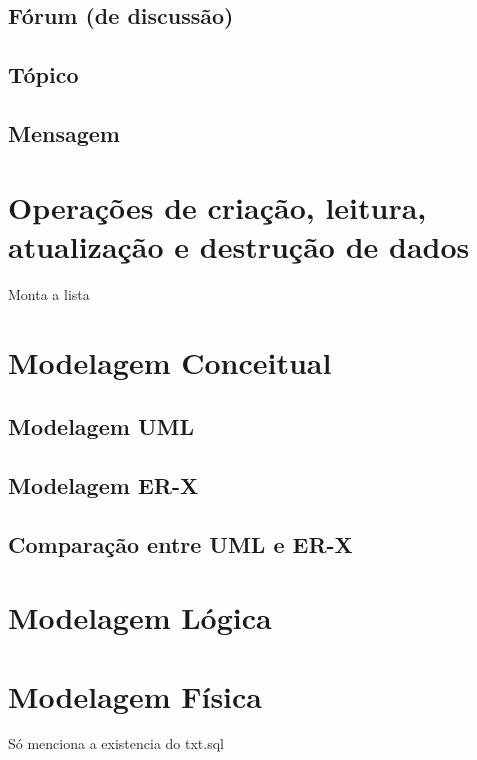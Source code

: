 \documentclass{article}
\begin{document}
	\subsection{Fórum (de discussão)}

	\subsection{Tópico}

	\subsection{Mensagem}


\section{Operações de criação, leitura, atualização e destrução de dados}

	Monta a lista


\section{Modelagem Conceitual}

	\subsection{Modelagem UML}

	\subsection{Modelagem ER-X}

	\subsection{Comparação entre UML e ER-X}



\section{Modelagem Lógica}



\section{Modelagem Física}
	Só menciona a existencia do txt.sql
\end{document}
